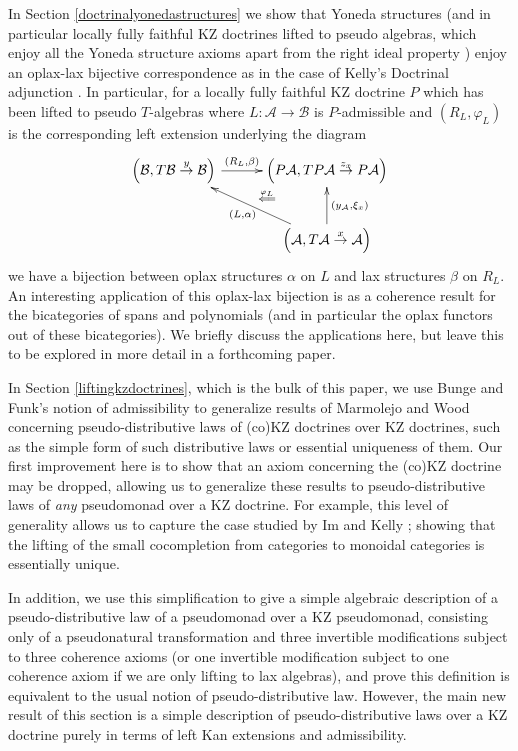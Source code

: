 \documentclass[a4paper,oneside,english]{amsart}
\numberwithin{equation}{section}
\numberwithin{figure}{section}
\theoremstyle{plain}
\theoremstyle{definition}
\theoremstyle{remark}
\theoremstyle{definition}
\theoremstyle{plain}
\theoremstyle{plain}
\theoremstyle{plain}
\begin{document}
In Section \ref{doctrinalyonedastructures} we show that Yoneda structures
(and in particular locally fully faithful KZ doctrines lifted to pseudo
algebras, which enjoy all the Yoneda structure axioms apart from the
right ideal property \cite{yonedakz}) enjoy an oplax-lax bijective
correspondence as in the case of Kelly's Doctrinal adjunction \cite{doctrinal}.
In particular, for a locally fully faithful KZ doctrine $P$ which
has been lifted to pseudo $T$-algebras where $L\colon\mathcal{A}\to\mathcal{B}$
is $P$-admissible and $\left(R_{L},\varphi_{L}\right)$ is the corresponding
left extension underlying the diagram
\[
\xymatrix@=1em{\left(\mathcal{B},T\mathcal{B}\overset{y}{\rightarrow}\mathcal{B}\right){\ar^-{{\left(R_{L},\beta\right)}}[{rr}]} &  & \left(P\mathcal{A},TP\mathcal{A}\overset{z_{x}}{\rightarrow}P\mathcal{A}\right)\ar@{}[ld]|-{\stackrel{\varphi_{L}}{\Longleftarrow}}\\
 & \;\\
 &  & \left(\mathcal{A},T\mathcal{A}\overset{x}{\rightarrow}\mathcal{A}\right)\ar[uu]_{\left(y_{\mathcal{A}},\xi_{x}\right)}\ar[uull]^{\left(L,\alpha\right)}
}
\]
we have a bijection between oplax structures $\alpha$ on $L$ and
lax structures $\beta$ on $R_{L}$. An interesting application of
this oplax-lax bijection is as a coherence result for the bicategories
of spans and polynomials (and in particular the oplax functors out
of these bicategories). We briefly discuss the applications here,
but leave this to be explored in more detail in a forthcoming paper.

In Section \ref{liftingkzdoctrines}, which is the bulk of this paper,
we use Bunge and Funk's notion of admissibility to generalize results
of Marmolejo and Wood concerning pseudo-distributive laws of (co)KZ
doctrines over KZ doctrines, such as the simple form of such distributive
laws or essential uniqueness of them. Our first improvement here is
to show that an axiom concerning the (co)KZ doctrine may be dropped,
allowing us to generalize these results to pseudo-distributive laws
of \emph{any} pseudomonad over a KZ doctrine. For example, this level
of generality allows us to capture the case studied by Im and Kelly
\cite{uniconvolution}; showing that the lifting of the small cocompletion
from categories to monoidal categories is essentially unique.

In addition, we use this simplification to give a simple algebraic
description of a pseudo-distributive law of a pseudomonad over a KZ
pseudomonad, consisting only of a pseudonatural transformation and
three invertible modifications subject to three coherence axioms (or
one invertible modification subject to one coherence axiom if we are
only lifting to lax algebras), and prove this definition is equivalent
to the usual notion of pseudo-distributive law. However, the main
new result of this section is a simple description of pseudo-distributive
laws over a KZ doctrine purely in terms of left Kan extensions and
admissibility.
\end{document}
